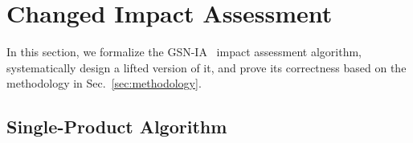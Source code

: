 \vspace{-0.1in}
\section{Changed Impact Assessment}
\label{sec:cia}
\vspace{-0.1in}
\newcommand{\CIA}{GSN\_IA}

In this section, we formalize the GSN-IA~\cite{Kokaly:2017} impact assessment algorithm, systematically design a lifted version of it, and prove its correctness based on the methodology in Sec.~\ref{sec:methodology}. 

\vspace{-0.1in}
\subsection{Single-Product Algorithm}
\vspace{-0.1in}



\newcommand{\Annotation}{\code{Annotation}}
\newcommand{\Reuse}{\code{Reuse}}
\newcommand{\Recheck}{\code{Recheck}}
\newcommand{\Revise}{\code{Revise}}
\newcommand{\SysEl}{\code{SysEl}}
\newcommand{\GSNEl}{\code{GSNEl}}
\newcommand{\Sys}{\code{Sys}}
\newcommand{\GSN}{\code{GSN}}
\newcommand{\TraceRel}{\code{TraceRel}}
\newcommand{\sliceSys}{\code{sliceSys}}
\newcommand{\sliceGSNV}{\code{sliceGSN\_V}}
\newcommand{\sliceGSNR}{\code{sliceGSN\_R}}
\newcommand{\Dlta}{\code{Delta}}
\newcommand{\restrict}{\code{restrict}}
\newcommand{\trace}{\code{trace}}
\newcommand{\createAnnotation}{\code{createAnnotation}}

